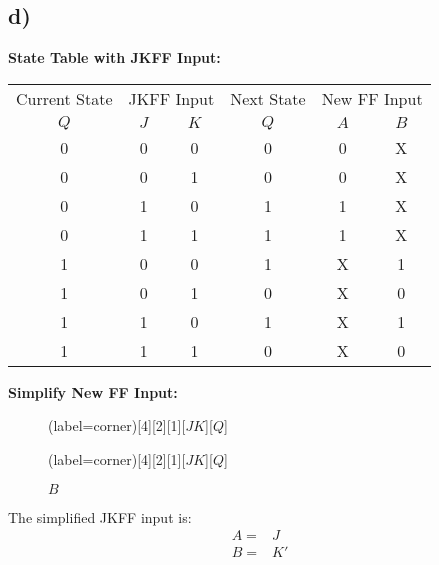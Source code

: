 \documentclass[a4paper,12pt]{article}
\begin{document}
\subsection*{d)}

\textbf{State Table with JKFF Input:}

\begin{center}
	\begin{tabular}{cccccc}
		\toprule
		Current State & \multicolumn{2}{c}{JKFF Input} & Next State & \multicolumn{2}{c}{New FF Input} \\
		\cmidrule(lr){1-1} \cmidrule(lr){2-3} \cmidrule(lr){4-4} \cmidrule(lr){5-6}
		$Q$ & $J$ & $K$ & $Q$ & $A$ & $B$ \\
		\midrule
		0 & 0 & 0 & 0 & 0 & X \\
		0 & 0 & 1 & 0 & 0 & X \\
		0 & 1 & 0 & 1 & 1 & X \\
		0 & 1 & 1 & 1 & 1 & X \\
		1 & 0 & 0 & 1 & X & 1 \\
		1 & 0 & 1 & 0 & X & 0 \\
		1 & 1 & 0 & 1 & X & 1 \\
		1 & 1 & 1 & 0 & X & 0 \\
		\bottomrule
	\end{tabular}
\end{center}

\textbf{Simplify New FF Input:}

\begin{figure}[H]
	\begin{minipage}{0.5\linewidth}
		\centering
		\begin{karnaugh-map}(label=corner)[4][2][1][$JK$][$Q$]
			\autoterms[X]
		\end{karnaugh-map}
		\caption*{$A$}
	\end{minipage}
	\begin{minipage}{0.5\linewidth}
		\centering
		\begin{karnaugh-map}(label=corner)[4][2][1][$JK$][$Q$]
			\autoterms[X]
		\end{karnaugh-map}
		\caption*{$B$}
	\end{minipage}
\end{figure}

The simplified JKFF input is:
\begin{align*}
	A =& J \\
	B =& K'
\end{align*}
\end{document}
